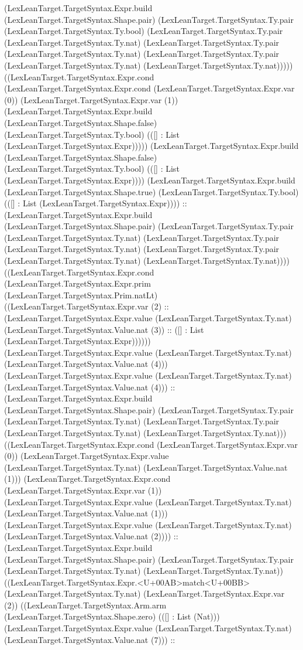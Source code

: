 \documentclass[11pt]{article}
\begin{document}
(LexLeanTarget.TargetSyntax.Expr.build (LexLeanTarget.TargetSyntax.Shape.pair) (LexLeanTarget.TargetSyntax.Ty.pair (LexLeanTarget.TargetSyntax.Ty.bool) (LexLeanTarget.TargetSyntax.Ty.pair (LexLeanTarget.TargetSyntax.Ty.nat) (LexLeanTarget.TargetSyntax.Ty.pair (LexLeanTarget.TargetSyntax.Ty.nat) (LexLeanTarget.TargetSyntax.Ty.pair (LexLeanTarget.TargetSyntax.Ty.nat) (LexLeanTarget.TargetSyntax.Ty.nat))))) ((LexLeanTarget.TargetSyntax.Expr.cond (LexLeanTarget.TargetSyntax.Expr.cond (LexLeanTarget.TargetSyntax.Expr.var (0)) (LexLeanTarget.TargetSyntax.Expr.var (1)) (LexLeanTarget.TargetSyntax.Expr.build (LexLeanTarget.TargetSyntax.Shape.false) (LexLeanTarget.TargetSyntax.Ty.bool) (([] : List (LexLeanTarget.TargetSyntax.Expr))))) (LexLeanTarget.TargetSyntax.Expr.build (LexLeanTarget.TargetSyntax.Shape.false) (LexLeanTarget.TargetSyntax.Ty.bool) (([] : List (LexLeanTarget.TargetSyntax.Expr)))) (LexLeanTarget.TargetSyntax.Expr.build (LexLeanTarget.TargetSyntax.Shape.true) (LexLeanTarget.TargetSyntax.Ty.bool) (([] : List (LexLeanTarget.TargetSyntax.Expr)))) :: (LexLeanTarget.TargetSyntax.Expr.build (LexLeanTarget.TargetSyntax.Shape.pair) (LexLeanTarget.TargetSyntax.Ty.pair (LexLeanTarget.TargetSyntax.Ty.nat) (LexLeanTarget.TargetSyntax.Ty.pair (LexLeanTarget.TargetSyntax.Ty.nat) (LexLeanTarget.TargetSyntax.Ty.pair (LexLeanTarget.TargetSyntax.Ty.nat) (LexLeanTarget.TargetSyntax.Ty.nat)))) ((LexLeanTarget.TargetSyntax.Expr.cond (LexLeanTarget.TargetSyntax.Expr.prim (LexLeanTarget.TargetSyntax.Prim.natLt) ((LexLeanTarget.TargetSyntax.Expr.var (2) :: (LexLeanTarget.TargetSyntax.Expr.value (LexLeanTarget.TargetSyntax.Ty.nat) (LexLeanTarget.TargetSyntax.Value.nat (3)) :: ([] : List (LexLeanTarget.TargetSyntax.Expr)))))) (LexLeanTarget.TargetSyntax.Expr.value (LexLeanTarget.TargetSyntax.Ty.nat) (LexLeanTarget.TargetSyntax.Value.nat (4))) (LexLeanTarget.TargetSyntax.Expr.value (LexLeanTarget.TargetSyntax.Ty.nat) (LexLeanTarget.TargetSyntax.Value.nat (4))) :: (LexLeanTarget.TargetSyntax.Expr.build (LexLeanTarget.TargetSyntax.Shape.pair) (LexLeanTarget.TargetSyntax.Ty.pair (LexLeanTarget.TargetSyntax.Ty.nat) (LexLeanTarget.TargetSyntax.Ty.pair (LexLeanTarget.TargetSyntax.Ty.nat) (LexLeanTarget.TargetSyntax.Ty.nat))) ((LexLeanTarget.TargetSyntax.Expr.cond (LexLeanTarget.TargetSyntax.Expr.var (0)) (LexLeanTarget.TargetSyntax.Expr.value (LexLeanTarget.TargetSyntax.Ty.nat) (LexLeanTarget.TargetSyntax.Value.nat (1))) (LexLeanTarget.TargetSyntax.Expr.cond (LexLeanTarget.TargetSyntax.Expr.var (1)) (LexLeanTarget.TargetSyntax.Expr.value (LexLeanTarget.TargetSyntax.Ty.nat) (LexLeanTarget.TargetSyntax.Value.nat (1))) (LexLeanTarget.TargetSyntax.Expr.value (LexLeanTarget.TargetSyntax.Ty.nat) (LexLeanTarget.TargetSyntax.Value.nat (2)))) :: (LexLeanTarget.TargetSyntax.Expr.build (LexLeanTarget.TargetSyntax.Shape.pair) (LexLeanTarget.TargetSyntax.Ty.pair (LexLeanTarget.TargetSyntax.Ty.nat) (LexLeanTarget.TargetSyntax.Ty.nat)) ((LexLeanTarget.TargetSyntax.Expr.<U+00AB>match<U+00BB> (LexLeanTarget.TargetSyntax.Ty.nat) (LexLeanTarget.TargetSyntax.Expr.var (2)) ((LexLeanTarget.TargetSyntax.Arm.arm (LexLeanTarget.TargetSyntax.Shape.zero) (([] : List (Nat))) (LexLeanTarget.TargetSyntax.Expr.value (LexLeanTarget.TargetSyntax.Ty.nat) (LexLeanTarget.TargetSyntax.Value.nat (7))) :: 
\end{document}
